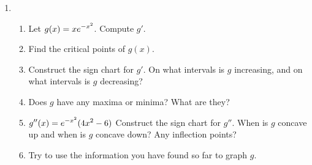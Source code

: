 \documentclass[10pt]{article}
\begin{document}
\begin{enumerate}
\item[Board 4.] \, 
\begin{enumerate}
    \item Let $\displaystyle g(x) = xe^{-x^2}$. Compute $g'$. 
    \item Find the critical points of $g(x)$. 
    \item Construct the sign chart for $g'$. On what intervals is $g$ increasing, and on what intervals is $g$ decreasing? 
    \item Does $g$ have any maxima or minima? What are they?
    \item   $\displaystyle g^{\prime\prime}(x)=e^{-x^2}(4x^2-6)$  Construct the sign chart for $g''$.  When is $g$ concave up and when is $g$ concave down? Any inflection points?
    \item Try to use the information you have found so far to graph $g$. 
\end{enumerate}

\end{enumerate}
\end{document}
